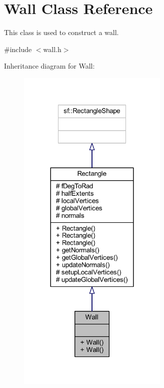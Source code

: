 \hypertarget{class_wall}{}\section{Wall Class Reference}
\label{class_wall}


This class is used to construct a wall.  




{\ttfamily \#include $<$wall.\+h$>$}



Inheritance diagram for Wall\+:\nopagebreak
\begin{figure}[H]
\begin{center}
\leavevmode
\includegraphics[width=204pt]{class_wall__inherit__graph}
\end{center}
\end{figure}


